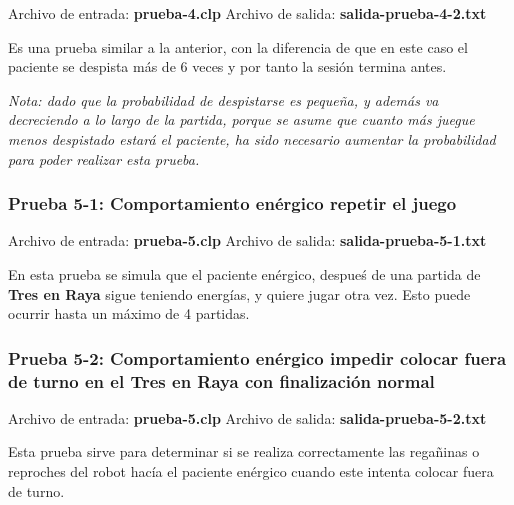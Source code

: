 \documentclass{uc3mpracticas}
\begin{document}
  Archivo de entrada: \textbf{prueba-4.clp} \hspace{15mm} Archivo de salida: \textbf{salida-prueba-4-2.txt}

  \vspace{2mm}

  Es una prueba similar a la anterior, con la diferencia de que en este caso el paciente se despista más de 6 veces y por tanto la sesión termina antes.

  \vspace{1mm}

  \textit{Nota: dado que la probabilidad de despistarse es pequeña, y además va decreciendo a lo largo de la partida, porque se asume que cuanto más juegue menos despistado estará el paciente, ha sido necesario aumentar la probabilidad para poder realizar esta prueba.}


  \subsubsection{Prueba 5-1: Comportamiento enérgico repetir el juego}


  Archivo de entrada: \textbf{prueba-5.clp} \hspace{15mm} Archivo de salida: \textbf{salida-prueba-5-1.txt}

  \vspace{2mm}

  En esta prueba se simula que el paciente enérgico, despueś de una partida de \textbf{Tres en Raya} sigue teniendo energías, y quiere jugar otra vez. Esto puede ocurrir hasta un máximo de 4 partidas.

  \subsubsection{Prueba 5-2: Comportamiento enérgico impedir colocar fuera de turno en el Tres en Raya con finalización normal}


  Archivo de entrada: \textbf{prueba-5.clp} \hspace{15mm} Archivo de salida: \textbf{salida-prueba-5-2.txt}

  \vspace{2mm}

  Esta prueba sirve para determinar si se realiza correctamente las regañinas o reproches del robot hacía el paciente enérgico cuando este intenta colocar fuera de turno.

  \vspace{1mm}
\end{document}
